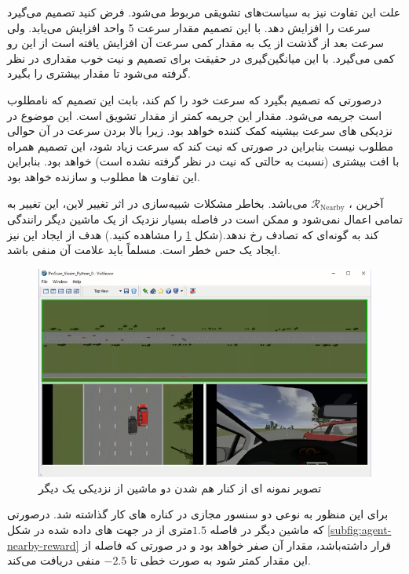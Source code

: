 علت این تفاوت نیز به سیاست‌های تشویقی مربوط می‌شود. فرض کنید  تصمیم می‌گیرد سرعت را افزایش دهد. با این تصمیم مقدار سرعت 5 واحد افزایش می‌یابد. ولی سرعت بعد از گذشت از یک  به مقدار کمی سرعت آن افزایش یافته است از این رو  کمی می‌گیرد. با این میانگین‌گیری در حقیقت برای تصمیم و نیت خوب  مقداری  در نظر گرفته ‌می‌شود تا مقدار  بیشتری را بگیرد. 

درصورتی که  
تصمیم بگیرد که سرعت خود را کم کند، بابت این تصمیم که نامطلوب است جریمه می‌شود. مقدار این جریمه کمتر از مقدار تشویق است. این موضوع در نزدیکی های سرعت بیشینه کمک کننده خواهد بود. زیرا بالا بردن سرعت در آن حوالی مطلوب نیست بنابراین در صورتی که نیت کند که سرعت زیاد شود، این تصمیم  همراه با افت  بیشتری (نسبت به حالتی که نیت در نظر گرفته نشده است) خواهد بود. بنابراین این تفاوت ها مطلوب و سازنده خواهد بود. 



آخرین ، $\mathcal{R}_{\mathrm{Nearby}}$ می‌باشد. بخاطر مشکلات شبیه‌سازی در اثر تغییر لاین، این تغییر به تمامی اعمال نمی‌شود و ممکن است  در فاصله بسیار نزدیک از یک ماشین دیگر رانندگی کند به گونه‌ای که تصادف رخ ندهد.(شکل
\ref{fig:obs-nearby}
را مشاهده کنید.) هدف از ایجاد این  نیز ایجاد یک حس خطر است. مسلماً باید علامت آن منفی باشد. 


\begin{figure}
	\centering
	\includegraphics[width=1\linewidth]{Figures/OBS/nearby}
	\caption{تصویر نمونه ای از کنار هم شدن دو ماشین از نزدیکی یک دیگر}
	\label{fig:obs-nearby}
\end{figure}



برای این منظور به نوعی دو سنسور مجازی در کناره های  کار گذاشته شد.
درصورتی که ماشین دیگر در فاصله $1.5$متری از  در جهت های داده شده در شکل \ref{subfig:agent-nearby-reward} قرار داشته‌باشد، مقدار آن صفر ‌خواهد بود و در صورتی که فاصله از این مقدار کمتر شود به صورت خطی تا $-2.5$  منفی دریافت می‌کند.

